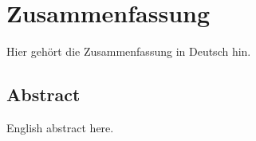 \chapter*{Zusammenfassung}

Hier gehört die Zusammenfassung in Deutsch hin.

\vspace{1.3em} 					%
\section*{\huge Abstract} 	%
\vspace{1.3em} 					%

English abstract here.


